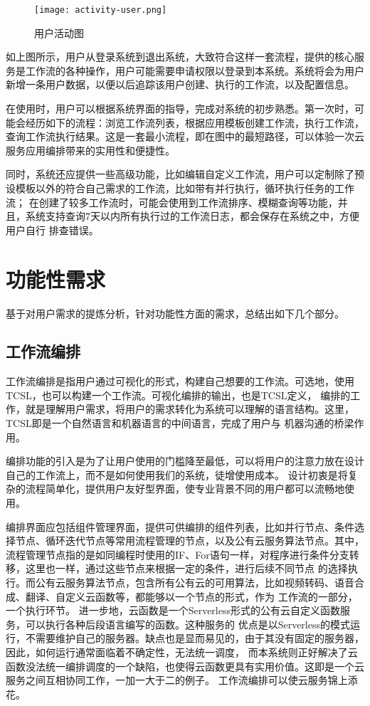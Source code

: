 \begin{figure}[H]
    \centering
    \texttt{[image: activity-user.png]}
    \caption{用户活动图}
    \label{fig:yhhd}
    \note{}
\end{figure}

如上图所示，用户从登录系统到退出系统，大致符合这样一套流程，提供的核心服务是工作流的各种操作，用户可能需要申请权限以登录到本系统。系统将会为用户
新增一条用户数据，以便以后追踪该用户创建、执行的工作流，以及配置信息。

在使用时，用户可以根据系统界面的指导，完成对系统的初步熟悉。第一次时，可能会经历如下的流程：浏览工作流列表，根据应用模板创建工作流，执行工作流，
查询工作流执行结果。这是一套最小流程，即在图中的最短路径，可以体验一次云服务应用编排带来的实用性和便捷性。

同时，系统还应提供一些高级功能，比如编辑自定义工作流，用户可以定制除了预设模板以外的符合自己需求的工作流，比如带有并行执行，循环执行任务的工作流；
在创建了较多工作流时，可能会使用到工作流排序、模糊查询等功能，并且，系统支持查询7天以内所有执行过的工作流日志，都会保存在系统之中，方便用户自行
排查错误。



\section{功能性需求}
基于对用户需求的提炼分析，针对功能性方面的需求，总结出如下几个部分。

\subsection{工作流编排}
工作流编排是指用户通过可视化的形式，构建自己想要的工作流。可选地，使用TCSL，也可以构建一个工作流。可视化编排的输出，也是TCSL定义，
编排的工作，就是理解用户需求，将用户的需求转化为系统可以理解的语言结构。这里，TCSL即是一个自然语言和机器语言的中间语言，完成了用户与
机器沟通的桥梁作用。

编排功能的引入是为了让用户使用的门槛降至最低，可以将用户的注意力放在设计自己的工作流上，而不是如何使用我们的系统，徒增使用成本。
设计初衷是将复杂的流程简单化，提供用户友好型界面，使专业背景不同的用户都可以流畅地使用。

编排界面应包括组件管理界面，提供可供编排的组件列表，比如并行节点、条件选择节点、循环迭代节点等常用流程管理的节点，以及公有云服务算法节点。其中，
流程管理节点指的是如同编程时使用的IF、For语句一样，对程序进行条件分支转移，这里也一样，通过这些节点来根据一定的条件，进行后续不同节点
的选择执行。而公有云服务算法节点，包含所有公有云的可用算法，比如视频转码、语音合成、翻译、自定义云函数等，都能够以一个节点的形式，作为
工作流的一部分，一个执行环节。 进一步地，云函数是一个Serverless形式的公有云自定义函数服务，可以执行各种后段语言编写的函数。这种服务的
优点是以Serverless的模式运行，不需要维护自己的服务器\cite{Jeffery_2021}。缺点也是显而易见的，由于其没有固定的服务器，因此，如何运行通常面临着不确定性，无法统一调度，
而本系统则正好解决了云函数没法统一编排调度的一个缺陷，也使得云函数更具有实用价值。这即是一个云服务之间互相协同工作，一加一大于二的例子。
工作流编排可以使云服务锦上添花。

